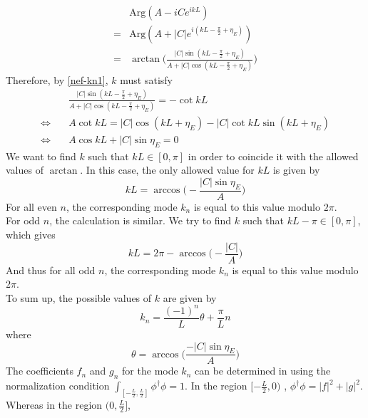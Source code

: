 \begin{equation}
\begin{split}
&\textrm{Arg}(A - iC e^{ikL}) \\
= &\textrm{Arg}(A + |C| e^{i(kL - \frac{\pi}{2} + \eta_E)}) \\
= & \arctan \bigg( \frac{|C| \sin(kL - \frac{\pi}{2} + \eta_E)}{A + | C| \cos(kL - \frac{\pi}{2} + \eta_E) }\bigg)
\end{split}
\end{equation}
Therefore, by \cref{nef-kn1}, $k$ must satisfy
\begin{equation}\label{nef-arctan}
\begin{split}
& \frac{|C| \sin(kL - \frac{\pi}{2} + \eta_E)}{A + | C| \cos(kL - \frac{\pi}{2} + \eta_E) } =  - \cot kL  \\
\Leftrightarrow \quad & A \cot kL = |C| \cos(kL + \eta_E) - |C| \cot kL \sin(kL + \eta_E)  \\
%
\Leftrightarrow\quad &
A \cos kL + |C| \sin\eta_E= 0
\end{split}
\end{equation}
We want to find $k$ such that $kL \in [0, \pi]$ in order to coincide it with the allowed values of $\arctan$.
In this case, the only allowed value for $kL$ is given by
\begin{equation*}
kL = \arccos \big(-\frac{|C|\sin\eta_E}{A}\big)
\end{equation*}
For all even $n$, the corresponding mode $k_n$ is equal to this value modulo $2 \pi$. \\
For odd $n$, the calculation is similar.
We try to find $k$ such that $kL - \pi \in [0, \pi]$, which gives 
\begin{equation*}
kL = 2\pi - \arccos \big(-\frac{|C|}{A}\big)
\end{equation*} 
And thus for all odd $n$, the corresponding mode $k_n$ is equal to this value modulo $2 \pi$.\\
To sum up, the possible values of $k$ are given by
\begin{equation*}
k_{n} = \frac{(-1)^n}{L}\theta  + \frac{\pi}{L}n 
\end{equation*}
where
\begin{equation*}
\theta = \arccos\bigg( \frac{-|C| \sin \eta_E}{A} \bigg)
\end{equation*}
The coefficients $f_{n}$ and $g_{n}$ for the mode $k_{ n}$ can be determined in using the normalization condition  $\int_{[-\frac{L}{2}, \frac{L}{2}]}\phi^\dagger \phi = 1$. 
In the region $[-\frac{L}{2}, 0)$ , $\phi^\dagger \phi = | f |^2 + | g |^2$. Whereas in the region $(0, \frac{L}{2}]$, 
